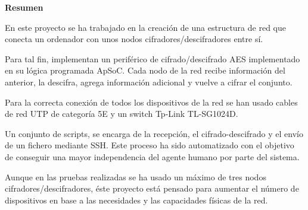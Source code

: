 \begin{center}
	\bigskip
	\bigskip
	\textbf{\huge {Resumen}}\\
	\bigskip
\end{center}
	En este proyecto se ha trabajado en la creación de una estructura de red que conecta un ordenador con unos nodos cifradores/descifradores entre sí.
	
	Para tal fin, implementan un periférico de cifrado/descifrado AES implementado en su lógica programada ApSoC. Cada nodo de la red recibe información del anterior, la descifra, agrega información adicional y vuelve a cifrar el conjunto.
	
	Para la correcta conexión de todos los dispositivos de la red se han usado cables de red UTP de categoría 5E y un switch Tp-Link TL-SG1024D.

	Un conjunto de scripts, se encarga de la recepción, el cifrado-descifrado y el envío de un fichero mediante SSH. Este proceso ha sido automatizado con el objetivo de conseguir una mayor independencia del agente humano por parte del sistema.
	
	Aunque en las pruebas realizadas se ha usado un máximo de tres nodos cifradores/descifradores, éste proyecto está pensado para aumentar el número de dispositivos en base a las necesidades y las capacidades físicas de la red.
	

